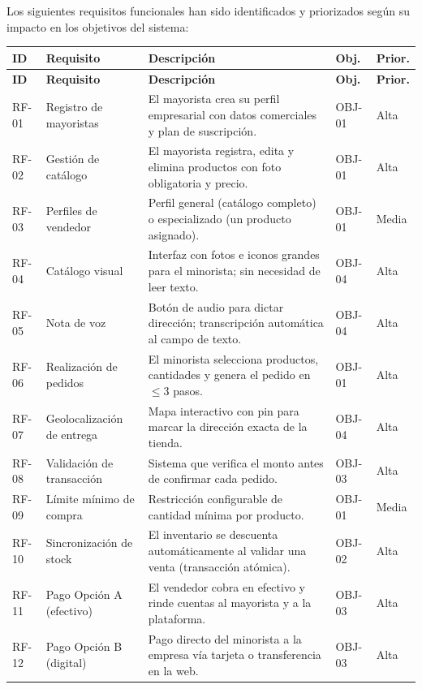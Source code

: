 \documentclass[12pt, a4paper]{article}
\begin{document}
Los siguientes requisitos funcionales han sido identificados y priorizados según su impacto en los objetivos del sistema:

\begin{longtable}{|C{1cm}|L{3cm}|L{6cm}|C{1.2cm}|C{1.2cm}|}
\hline
\textbf{ID} & \textbf{Requisito} & \textbf{Descripción} & \textbf{Obj.} & \textbf{Prior.} \\
\hline
\endfirsthead
\hline
\textbf{ID} & \textbf{Requisito} & \textbf{Descripción} & \textbf{Obj.} & \textbf{Prior.} \\
\hline
\endhead
RF-01 & Registro de mayoristas & El mayorista crea su perfil empresarial con datos comerciales y plan de suscripción. & OBJ-01 & Alta \\ \hline
RF-02 & Gestión de catálogo & El mayorista registra, edita y elimina productos con foto obligatoria y precio. & OBJ-01 & Alta \\ \hline
RF-03 & Perfiles de vendedor & Perfil general (catálogo completo) o especializado (un producto asignado). & OBJ-01 & Media \\ \hline
RF-04 & Catálogo visual & Interfaz con fotos e iconos grandes para el minorista; sin necesidad de leer texto. & OBJ-04 & Alta \\ \hline
RF-05 & Nota de voz & Botón de audio para dictar dirección; transcripción automática al campo de texto. & OBJ-04 & Alta \\ \hline
RF-06 & Realización de pedidos & El minorista selecciona productos, cantidades y genera el pedido en $\leq$3 pasos. & OBJ-01 & Alta \\ \hline
RF-07 & Geolocalización de entrega & Mapa interactivo con pin para marcar la dirección exacta de la tienda. & OBJ-04 & Alta \\ \hline
RF-08 & Validación de transacción & Sistema que verifica el monto antes de confirmar cada pedido. & OBJ-03 & Alta \\ \hline
RF-09 & Límite mínimo de compra & Restricción configurable de cantidad mínima por producto. & OBJ-01 & Media \\ \hline
RF-10 & Sincronización de stock & El inventario se descuenta automáticamente al validar una venta (transacción atómica). & OBJ-02 & Alta \\ \hline
RF-11 & Pago Opción A (efectivo) & El vendedor cobra en efectivo y rinde cuentas al mayorista y a la plataforma. & OBJ-03 & Alta \\ \hline
RF-12 & Pago Opción B (digital) & Pago directo del minorista a la empresa vía tarjeta o transferencia en la web. & OBJ-03 & Alta \\ \hline

\end{longtable}
\end{document}
